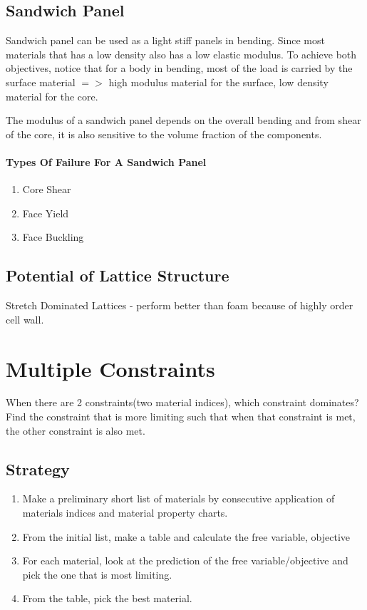 \documentclass{article}
\begin{document}
    \subsection*{Sandwich Panel}
    Sandwich panel can be used as a light stiff panels in bending. Since most materials that
    has a low density also has a low elastic modulus. To achieve both objectives, notice that
    for a body in bending, most of the load is carried by the surface material $=>$ high modulus material for the surface, low
    density material for the core.
    \vspace{1em}

    \noindent The modulus of a sandwich panel depends on the overall bending and from shear of the core, it is also 
    sensitive to the volume fraction of the components.

    \paragraph*{Types Of Failure For A Sandwich Panel}
    \begin{enumerate}
        \item Core Shear
        \item Face Yield
        \item Face Buckling
    \end{enumerate}

    \subsection*{Potential of Lattice Structure}
    Stretch Dominated Lattices  - perform better than foam because of highly order cell wall. 

    \section{Multiple Constraints}
    When there are 2 constraints(two material indices), which constraint dominates?
    Find the constraint that is more limiting such that when that constraint is met, the 
    other constraint is also met.
    
    \subsection*{Strategy}

        \begin{enumerate}
            \item Make a preliminary short list of materials by consecutive application of materials indices 
                  and material property charts.
            \item From the initial list, make a table and calculate the free variable, objective
            \item For each material, look at the prediction of the free variable/objective and pick the one 
                  that is most limiting.
            \item From the table, pick the best material.
        \end{enumerate}
\end{document}
